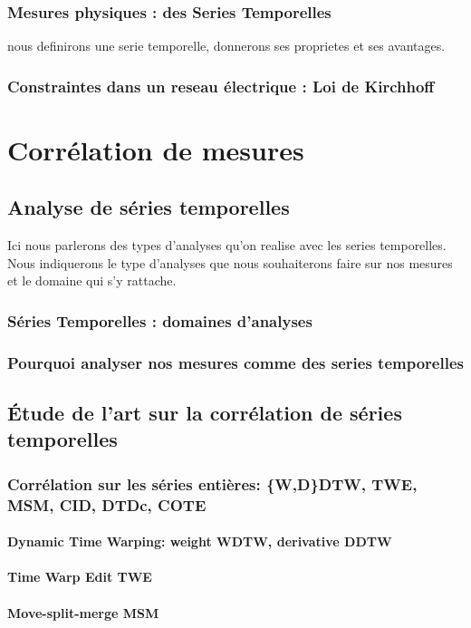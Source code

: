 \documentclass[onecolumn, 12pt]{book}
\begin{document}
		\subsection{Mesures physiques : des Series Temporelles}
			nous definirons une serie temporelle, donnerons ses proprietes et ses avantages.
		\subsection{Constraintes dans un reseau \'electrique : Loi de Kirchhoff}
	
\chapter{Corr\'elation de mesures}
	\section{Analyse de s\'eries temporelles}
	Ici nous parlerons des types d'analyses qu'on realise avec les series temporelles.
	Nous indiquerons le type d'analyses que nous souhaiterons faire sur nos mesures et le domaine qui s'y rattache. 
		\subsection{S\'eries Temporelles : domaines d'analyses}
		\subsection{Pourquoi analyser nos mesures comme des series temporelles}
	\section{\'Etude de l'art sur la corr\'elation de s\'eries temporelles}
		\subsection{Corr\'elation sur les s\'eries enti\`eres: \{W,D\}DTW, TWE, MSM, CID, DTDc, COTE}
			\subsubsection{Dynamic Time Warping: weight WDTW, derivative DDTW }
			\subsubsection{Time Warp Edit TWE}
			\subsubsection{Move-split-merge MSM}
\end{document}

